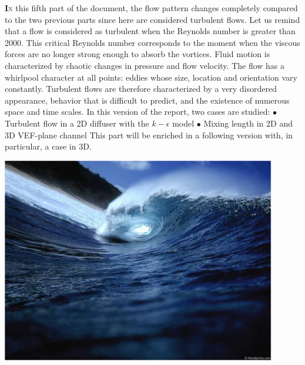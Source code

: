 \lettrine[lines=2,slope=0pt,nindent=4pt]{\textbf{I}}{n} this fifth part of the document,
the flow pattern changes completely compared to the two previous parts since here are considered turbulent flows.
Let us remind that a flow is considered as turbulent when the Reynolds number is greater than 2000.
This critical Reynolds number corresponds to the moment when the viscous forces are no longer strong enough
to absorb the vortices. Fluid motion is characterized by chaotic changes in pressure and flow velocity.
The flow has a whirlpool character at all points: eddies whose size, location and orientation vary constantly.
Turbulent flows are therefore characterized by a very disordered appearance, behavior that is difficult to predict,
and the existence of numerous space and time scales.\newline
In this version of the report, two cases are studied:\vspace*{0.3cm}\newline
\hspace*{0.5cm} $\bullet$ Turbulent flow in a 2D diffuser with the $k-\epsilon$ model\vspace*{0.3cm}\newline
\hspace*{0.5cm} $\bullet$ Mixing length in 2D and 3D VEF-plane channel\vspace*{0.3cm}\newline
This part will be enriched in a following version with, in particular, a case in 3D.\vspace*{2cm}\newline
\begin{center}\includegraphics[width=12cm]{tools/mer_turb.png}\end{center}
